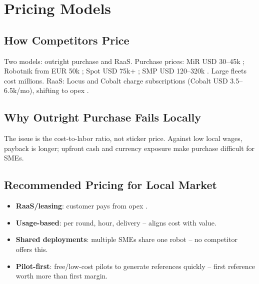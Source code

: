 \chapter{Pricing Models}

\section{How Competitors Price}

Two models: outright purchase and RaaS. Purchase prices: MiR USD 30--45k \cite{mir250}; Robotnik from EUR 50k \cite{robotnik_kairos}; Spot USD 75k+ \cite{standardbots_amr}; SMP USD 120--320k \cite{mordor_security}. Large fleets cost millions. RaaS: Locus and Cobalt charge subscriptions (Cobalt USD 3.5--6.5k/mo), shifting to opex \cite{builtin_raas,coherent_security}.

\section{Why Outright Purchase Fails Locally}

The issue is the cost-to-labor ratio, not sticker price. Against low local wages, payback is longer; upfront cash and currency exposure make purchase difficult for SMEs.

\section{Recommended Pricing for Local Market}

\begin{itemize}
    \item \textbf{RaaS/leasing}: customer pays from opex \cite{builtin_raas}.
    \item \textbf{Usage-based}: per round, hour, delivery -- aligns cost with value.
    \item \textbf{Shared deployments}: multiple SMEs share one robot -- no competitor offers this.
    \item \textbf{Pilot-first}: free/low-cost pilots to generate references quickly -- first reference worth more than first margin.
\end{itemize}


